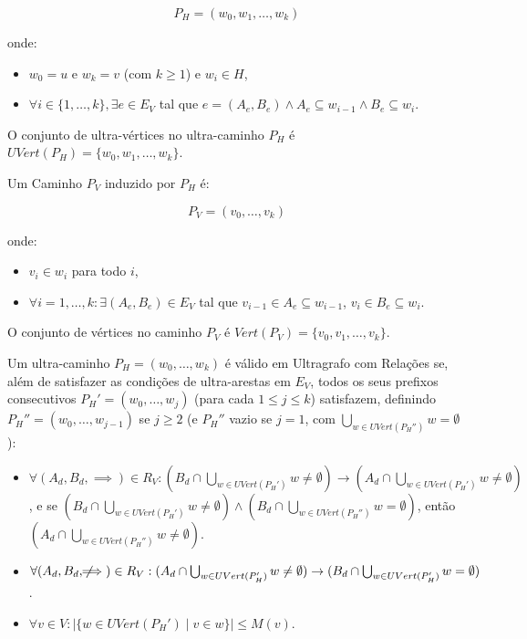 \documentclass{article}
\begin{document}
\[ P_H = (w_0, w_1, \dots, w_k) \]

onde:

\begin{itemize}
    \item \( w_0 = u \) e \( w_k = v \) (com \( k \geq 1 \)) e \( w_i \in H \),
    \item \( \forall i \in \{1, \dots, k\}, \exists e \in E_V \) tal que \( e = (A_e, B_e) \wedge A_e \subseteq w_{i-1} \wedge B_e \subseteq w_i \).
\end{itemize}

O conjunto de ultra-vértices no ultra-caminho \( P_H \) é \( UVert(P_H) = \{ w_0, w_1, \dots, w_k \} \).

Um Caminho \( P_V \) induzido por \( P_H \) é:

\[ P_V = (v_0, \dots, v_k) \]

onde:

\begin{itemize}
    \item \( v_i \in w_i \) para todo \( i \),
    \item \( \forall i = 1, \dots, k: \exists (A_e, B_e) \in E_V \) tal que \( v_{i-1} \in A_e \subseteq w_{i-1} \), \( v_i \in B_e \subseteq w_i \).
\end{itemize}

O conjunto de vértices no caminho \( P_V \) é \( Vert(P_V) = \{ v_0, v_1, \dots, v_k \} \).

Um ultra-caminho \( P_H = (w_0, \dots, w_k) \) é válido em Ultragrafo com Relações se, além de satisfazer as condições de ultra-arestas em \( E_V \), todos os seus prefixos consecutivos \( P_H' = (w_0, \dots, w_j) \) (para cada \( 1 \leq j \leq k \)) satisfazem, definindo \( P_H'' = (w_0, \dots, w_{j-1}) \) se \( j \geq 2 \) (e \( P_H'' \) vazio se \( j = 1 \), com \( \bigcup_{w \in UVert(P_H'')} w = \emptyset \)):

\begin{itemize}
    \item \( \forall (A_d, B_d, \implies) \in R_V: (B_d \cap \bigcup_{w \in UVert(P_H')} w \neq \emptyset) \to (A_d \cap \bigcup_{w \in UVert(P_H')} w \neq \emptyset) \), e se \( (B_d \cap \bigcup_{w \in UVert(P_H')} w \neq \emptyset) \wedge (B_d \cap \bigcup_{w \in UVert(P_H'')} w = \emptyset) \), então \( (A_d \cap \bigcup_{w \in UVert(P_H'')} w \neq \emptyset) \).
    \item \( \forall (A_d, B_d, \not\!\!\!\implies) \in R_V: (A_d \cap \bigcup_{w \in UVert(P_H')} w \neq \emptyset) \to (B_d \cap \bigcup_{w \in UVert(P_H')} w = \emptyset) \).
    \item \( \forall v \in V: |\{ w \in UVert(P_H') \mid v \in w \}| \leq M(v) \).
\end{itemize}
\end{document}
